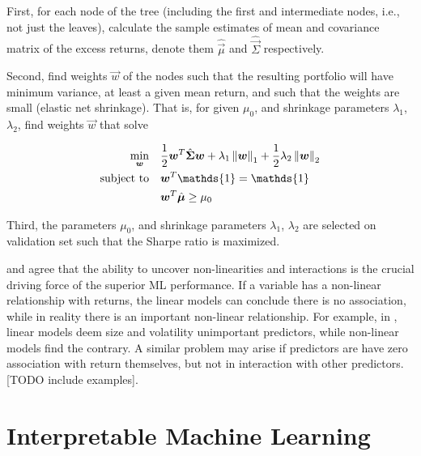 		First, for each node of the tree (including the first and intermediate nodes, i.e., not just the leaves), calculate the sample estimates of mean and covariance matrix of the excess returns, denote them $\hat{\vec{\mu}}$ and $\hat{\vec{\Sigma}}$ respectively.
		
		Second, find weights $\vec{w}$ of the nodes such that the resulting portfolio will have minimum variance, at least a given mean return, and such that the weights are small (elastic net shrinkage). That is, for given $\mu_0$, and shrinkage parameters $\lambda_1$, $\lambda_2$, find weights $\vec{w}$ that solve 
		
		\begin{equation}
		\begin{aligned}
		\min_{\vec{w}} \quad 
		& \frac{1}{2}\vec{w}^{T} \hat{\vec{\Sigma}} \vec{w} + \lambda_1 \norm{\vec{w}}_1 +  			\frac{1}{2} \lambda_2 \norm{\vec{w}}_2 \\
		\textrm{subject to} \quad 
		& \vec{w}^{T} \mathds{1} = \mathds{1} \\
		& \vec{w}^{T}\hat{\vec{\mu}} \geq \mu_0   \\
		\end{aligned}
		\end{equation}
		
		Third, the parameters $\mu_0$, and shrinkage parameters $\lambda_1$, $\lambda_2$ are selected on validation set such that the Sharpe ratio is maximized. 		
				
		\cite{bryzgalova2019forest} and \cite{gu2020empirical} agree that the ability to uncover non-linearities and interactions is the crucial driving force of the superior ML performance.  If a variable has a non-linear relationship with returns, the linear models can conclude there is no association, while in reality there is an important non-linear relationship. For example, in \cite{gu2020empirical}, linear models deem size and volatility unimportant predictors, while non-linear models find the contrary. A similar problem may arise if predictors are have zero association with return themselves, but not in interaction with other predictors. [TODO include examples]. 
	
	
	\section{Interpretable Machine Learning}
	
